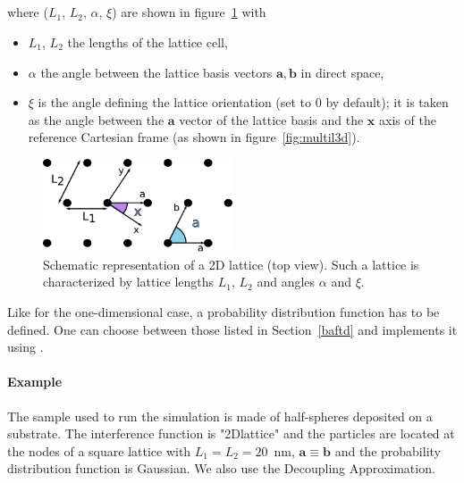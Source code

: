 \FloatBarrier

\newpage
\subsection{} 
where ($L_1$, $L_2$, $\alpha$, $\xi$) are shown in figure~\ref{fig:2dlattice} with 
\begin{itemize}
\item[]$L_1$, $L_2$ the lengths of the lattice cell, 
\item[]$\alpha$ the angle between the lattice basis vectors $\mathbf{a}, \mathbf{b}$ in direct space,
\item[] $\xi$ is the angle defining the lattice orientation (set to $0$ by default); it is taken as the angle between the $\mathbf{a}$ vector of the lattice basis and the $\mathbf{x}$ axis of the reference Cartesian frame (as shown in figure~\ref{fig:multil3d}).
\end{itemize}

\begin{figure}[tb]
\begin{center}
\includegraphics[width=0.5\textwidth]{fig/drawing/2Dlattice.pdf}
\end{center}
\caption{Schematic representation of a 2D lattice (top view). Such a lattice is characterized by lattice lengths $L_1$, $L_2$ and angles $\alpha$ and $\xi$.}
\label{fig:2dlattice}
\end{figure}

Like for the one-dimensional case, a probability distribution function  has to be defined. One can choose between those listed in Section~\ref{baftd} and implements it using .

\paragraph{Example} The sample used to run the simulation is made of half-spheres deposited on a substrate. The interference function is "2Dlattice" and the particles are located at the nodes of a square lattice with $L_1=L_2=20$~nm, $\mathbf{a}\equiv \mathbf{b}$ and the probability distribution function is Gaussian. We also use the Decoupling Approximation. 

